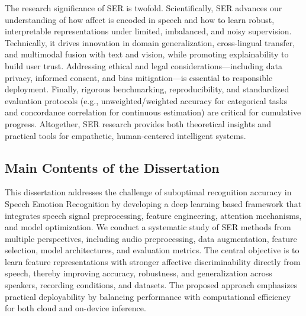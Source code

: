 The research significance of SER is twofold. Scientifically, SER advances our understanding of how affect is encoded in speech and how to learn robust, interpretable representations under limited, imbalanced, and noisy supervision. Technically, it drives innovation in domain generalization, cross-lingual transfer, and multimodal fusion with text and vision, while promoting explainability to build user trust. Addressing ethical and legal considerations—including data privacy, informed consent, and bias mitigation—is essential to responsible deployment. Finally, rigorous benchmarking, reproducibility, and standardized evaluation protocols (e.g., unweighted/weighted accuracy for categorical tasks and concordance correlation for continuous estimation) are critical for cumulative progress. Altogether, SER research provides both theoretical insights and practical tools for empathetic, human-centered intelligent systems.


\subsection{Main Contents of the Dissertation}
This dissertation addresses the challenge of suboptimal recognition accuracy in Speech Emotion Recognition by developing a deep learning based framework that integrates speech signal preprocessing, feature engineering, attention mechanisms, and model optimization. We conduct a systematic study of SER methods from multiple perspectives, including audio preprocessing, data augmentation, feature selection, model architectures, and evaluation metrics. The central objective is to learn feature representations with stronger affective discriminability directly from speech, thereby improving accuracy, robustness, and generalization across speakers, recording conditions, and datasets. The proposed approach emphasizes practical deployability by balancing performance with computational efficiency for both cloud and on-device inference.

